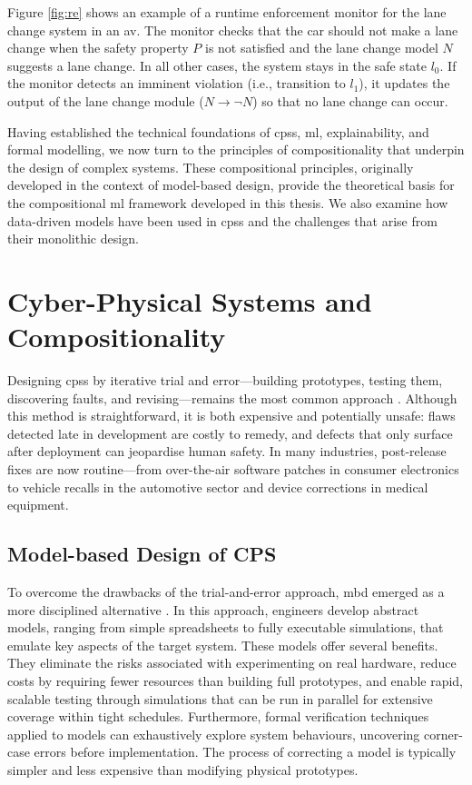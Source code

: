 Figure \ref{fig:re} shows an example of a runtime enforcement monitor for the lane change system in an  \gls{av}. The monitor checks that the car should not make a lane change when the safety property $P$ is not satisfied and the lane change model $N$ suggests a lane change. In all other cases, the system stays in the safe state $l_0$. If the monitor detects an imminent violation (i.e., transition to $l_1$), it updates the output of the lane change module ($N \rightarrow \neg N$) so that no lane change can occur. 


Having established the technical foundations of \glspl{cps}, \gls{ml}, explainability, and formal modelling, we now turn to the principles of compositionality that underpin the design of complex systems. These compositional principles, originally developed in the context of model-based design, provide the theoretical basis for the compositional \gls{ml} framework developed in this thesis. We also examine how data-driven models have been used in \glspl{cps} and the challenges that arise from their monolithic design.


\section{Cyber-Physical Systems and Compositionality}

Designing \glspl{cps} by iterative trial and error—building prototypes, testing them, discovering faults, and revising—remains the most common approach \cite{tripakis_compositionality_2016}. Although this method is straightforward, it is both expensive and potentially unsafe: flaws detected late in development are costly to remedy, and defects that only surface after deployment can jeopardise human safety. In many industries, post-release fixes are now routine—from over-the-air software patches in consumer electronics to vehicle recalls in the automotive sector and device corrections in medical equipment.

\subsection{Model-based Design of CPS}

To overcome the drawbacks of the trial-and-error approach, \gls{mbd} emerged as a more disciplined alternative \cite{Nicolescu2018-vj}. In this approach, engineers develop abstract models, ranging from simple spreadsheets to fully executable simulations, that emulate key aspects of the target system. These models offer several benefits. They eliminate the risks associated with experimenting on real hardware, reduce costs by requiring fewer resources than building full prototypes, and enable rapid, scalable testing through simulations that can be run in parallel for extensive coverage within tight schedules. Furthermore, formal verification techniques applied to models can exhaustively explore system behaviours, uncovering corner-case errors before implementation. The process of correcting a model is typically simpler and less expensive than modifying physical prototypes.


